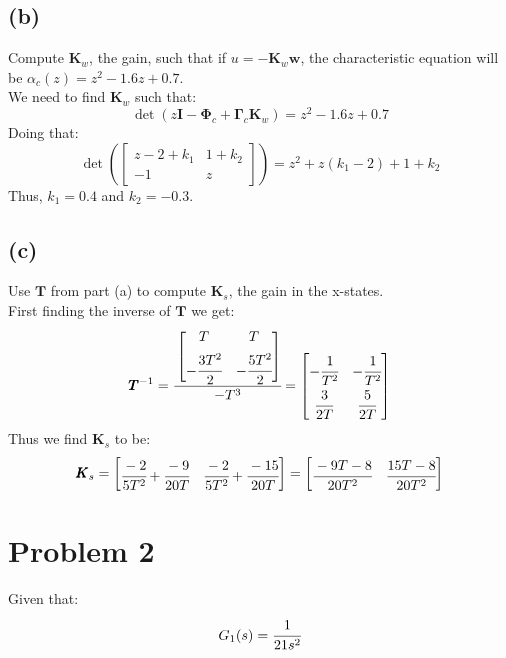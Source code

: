 \documentclass{article}
\begin{document}
\subsection*{(b)}
Compute $\pmb{K}_w$, the gain, such that if $u=-\pmb{K}_w\pmb{w}$, the characteristic equation will be $\alpha_c(z)=z^2-1.6z+0.7$.\\
We need to find $\pmb{K}_w$ such that:
\[\det(z\pmb{I}-\pmb{\Phi}_c+\pmb{\Gamma}_c\pmb{K}_w)=z^2-1.6z+0.7\]
Doing that:
\[\det\left (\begin{bmatrix}z-2+k_1&1+k_2\\-1&z\end{bmatrix}\right )=z^2+z(k_1-2)+1+k_2\]
Thus, $k_1=0.4$ and $k_2=-0.3$.

\subsection*{(c)}
Use $\pmb{T}$ from part (a) to compute $\pmb{K}_s$, the gain in the x-states.\\
First finding the inverse of $\pmb{T}$ we get:
\[\pmb{T}^{-1}=\cfrac{\begin{bmatrix}T&T\\[0.5em]-\cfrac{3T^2}{2}&-\cfrac{5T^2}{2}\end{bmatrix}}{-T^3}=\begin{bmatrix}-\cfrac{1}{T^2}&-\cfrac{1}{T^2}\\[0.5em]\cfrac{3}{2T}&\cfrac{5}{2T}\end{bmatrix}\]
Thus we find $\pmb{K}_s$ to be:
\[\pmb{K}_s=\begin{bmatrix}\cfrac{-2}{5T^2}+\cfrac{-9}{20T}&\cfrac{-2}{5T^2}+\cfrac{-15}{20T}\end{bmatrix}=\begin{bmatrix}\cfrac{-9T-8}{20T^2}&\cfrac{15T-8}{20T^2}\end{bmatrix}\]

\section*{Problem 2}
Given that:
\[G_1(s)=\cfrac{1}{21s^2}\]
\end{document}
